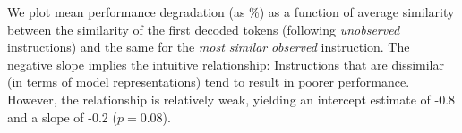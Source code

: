 \begin{comment}
\begin{table}[h]
  \small
  \centering
  \begin{tabular}{l l l}
    \toprule
    \textbf{Dataset}                 & \textbf{Avg. $\ell$2} ($\ell$2) & \textbf{Avg. $\Delta$ Accuracy} (\%) \\
    \midrule
    \textsc{MMLU}                    & \textbf{19.8}                   & -\textbf{1.5}\%                      \\
    \midrule
    \textsc{Novel Concepts}          & 22.0                            & -3.1\%                               \\
    \textsc{StrangeQA}               & 55.3                            & -5.5\%                               \\
    \textsc{Language Identification} & 59.0                            & -11.3\%                              \\
    \bottomrule
  \end{tabular}
  \caption{Average distances and accuracy degradations (as \%) on three datasets in \textsc{BBL}.}
  \label{table:distances}
\end{table}
\end{comment}


We plot mean performance degradation (as \%) as a function of average similarity between the similarity of the first decoded tokens (following \emph{unobserved} instructions) and the same for the \emph{most similar} \emph{observed} instruction.
The negative slope implies the intuitive relationship: Instructions that are dissimilar (in terms of model representations) tend to result in poorer performance.  However, the relationship is relatively weak, yielding an intercept estimate of -0.8 and a slope of -0.2 ($p=$0.08).


